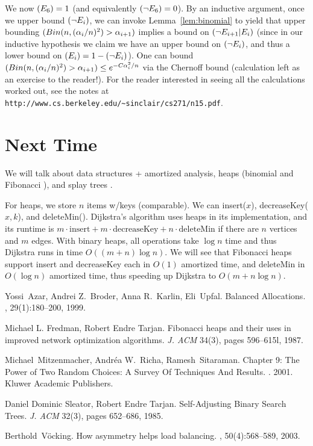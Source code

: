 \documentclass[11pt]{article}
\let\Pr\relax
\DeclareMathOperator*{\Pr}{\mathbb{P}}
\begin{document}
We now $\Pr(E_6) = 1$ (and equivalently $\Pr(\neg E_6) = 0$). By an inductive argument, once we upper bound $\Pr(\neg E_i)$, we can invoke Lemma~\ref{lem:binomial} to yield that upper bounding $\Pr(Bin(n, (\alpha_i/n)^2) > \alpha_{i+1})$ implies a bound on $\Pr(\neg E_{i+1} | E_i)$ (since in our inductive hypothesis we claim we have an upper bound on $\Pr(\neg E_i)$, and thus a lower bound on $\Pr(E_i) = 1 - \Pr(\neg E_i)$). One can bound $\Pr(Bin(n, (\alpha_i/n)^2) > \alpha_{i+1}) \le e^{-C\alpha_i^2 / n}$ via the Chernoff bound (calculation left as an exercise to the reader!). For the reader interested in seeing all the calculations worked out, see the notes at \texttt{http://www.cs.berkeley.edu/{\textasciitilde}sinclair/cs271/n15.pdf}.

\section{Next Time}

We will talk about data structures + amortized analysis, heaps (binomial and Fibonacci \cite{FT87}), and splay
trees \cite{ST85}.

For heaps, we store $n$ items w/keys (comparable). We can insert($x$), decreaseKey($x, k$),
and deleteMin(). Dijkstra's algorithm uses heaps in its implementation, and its runtime is
$m \cdot \text{insert} + m \cdot \text{decreaseKey} + n \cdot \text{deleteMin}$ if there are $n$
vertices and $m$ edges. With binary heaps, all operations take $\log n$ time and thus Dijkstra runs in time $O((m+n)\log n)$. We will see that Fibonacci heaps support insert and decreaseKey each in $O(1)$ amortized time, and deleteMin in $O(\log n)$ amortized time, thus speeding up Dijkstra to $O(m + n\log n)$.




\begin{thebibliography}{42}

Yossi~Azar, Andrei Z.~Broder, Anna R.~Karlin, Eli~Upfal.
\newblock Balanced Allocations.
, 29(1):180--200, 1999.

Michael L. Fredman, Robert Endre Tarjan.
Fibonacci heaps and their uses in improved network optimization algorithms.
{\em J. ACM} 34(3), pages 596--615l, 1987.

Michael~Mitzenmacher, Andr\'{e}a W.~Richa, Ramesh~Sitaraman.
\newblock Chapter 9: The Power of Two Random Choices:
A Survey Of Techniques And Results.
. 2001. Kluwer Academic Publishers.

Daniel Dominic Sleator, Robert Endre Tarjan.
Self-Adjusting Binary Search Trees. 
{\em J. ACM} 32(3), pages 652--686, 1985.

Berthold~V\"ocking.
\newblock How asymmetry helps load balancing.
, 50(4):568--589, 2003.

\end{thebibliography}
\end{document}
